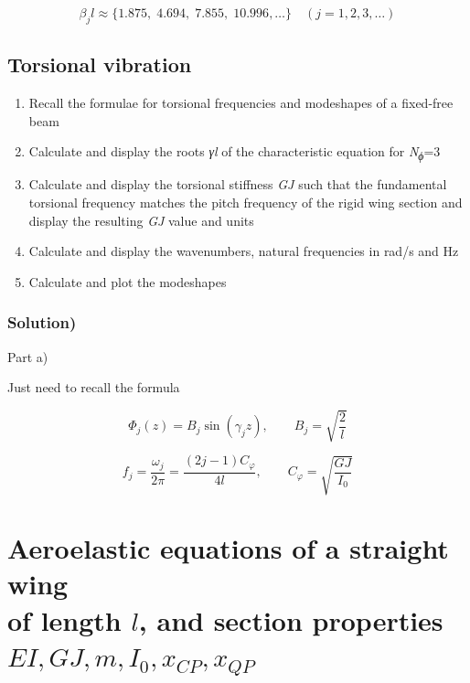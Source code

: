 \documentclass[11pt]{article}
\begin{document}
\[
\beta_{j} l \approx \{1.875,\;4.694,\;7.855,\;10.996,\ldots\} \quad (j=1,2,3,\ldots)
\]

\subsection{Torsional vibration}\label{torsional-vibration}

\begin{enumerate}
\def\labelenumi{(\alph{enumi})}
\item
  Recall the formulae for torsional frequencies and modeshapes of a
  fixed-free beam
\item
  Calculate and display the roots \emph{γl} of the characteristic
  equation for \emph{N\textsubscript{ϕ}}=3
\item
  Calculate and display the torsional stiffness \emph{GJ} such that the
  fundamental torsional frequency matches the pitch frequency of the
  rigid wing section and display the resulting \emph{GJ} value and units
\item
  Calculate and display the wavenumbers, natural frequencies in rad/s
  and Hz
\item
  Calculate and plot the modeshapes
\end{enumerate}

\subsubsection{Solution)}\label{solution-1}

Part a)

Just need to recall the formula

\[
\Phi_{j}(z) = B_{j}\sin(\gamma_{j} z), \qquad B_{j} = \sqrt{\frac{2}{l}}
\]

\[
f_{j} = \frac{\omega_{j}}{2\pi} = \frac{(2j - 1)C_{\varphi}}{4l}, \qquad
C_{\varphi} = \sqrt{\frac{GJ}{I_{0}}}
\]

\section{\texorpdfstring{Aeroelastic equations of a straight wing\\
of length $l$, and section properties $EI, GJ, m, I_0, x_{CP}, x_{QP}$}
{Aeroelastic equations of a straight wing of length l, and section properties EI, GJ, m, I0, xCP, xQP}}%
\label{aeroelastic-equations-of-a-straight-wing-of-length-l-and-section-properties-ei-gj-m-i0-xcp-xqp}
\end{document}
